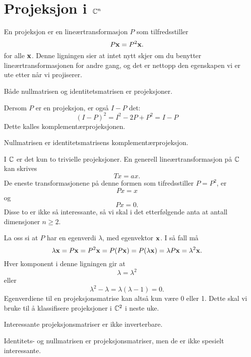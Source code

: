 



 \section*{Projeksjon i $\mathbb{C}^n$}
En projeksjon er en lineærtransformasjon $P$ som tilfredsstiller
\[
 P\mathbf{x}=P^2\mathbf{x}.
 \]
 for alle $\mathbf{x}$. Denne ligningen sier at intet nytt skjer om du benytter lineærtransformasjonen for andre gang, 
 og det er nettopp den egenskapen vi er ute etter når vi projiserer. 
 
 \begin{ex}
Både nullmatrisen og identitetsmatrisen er projeksjoner.
 \end{ex}
 
\noindent Dersom $P$ er en projeksjon, er også $I-P$ det:
\[
 (I-P)^2=I^2-2P+P^2=I-P
 \]
Dette kalles komplementærprojeksjonen.
 
\begin{ex}
Nullmatrisen er identitetsmatrisens  komplementærprojeksjon.
\end{ex}
 
 I $\mathbb{C}$ er det kun to trivielle projeksjoner. En generell lineærtransformasjon på $\mathbb{C}$ kan skrives 
 \[
 Tx=ax.
 \]
De eneste transformasjonene på denne formen som tifredsstiller $P=P^2$, er
 \[
 Px=x
\]
og 
 \[
 Px=0.
\]
Disse to er ikke så interessante, så vi skal i det etterfølgende anta at antall dimensjoner $n\geq 2$.

La oss si at $P$ har en egenverdi $\lambda$, med egenvektor $\mathbf{x}$. I så fall må
\[
\lambda \mathbf{x}=P\mathbf{x}=P^2\mathbf{x}=P(P\mathbf{x})=P(\lambda\mathbf{x})=\lambda P\mathbf{x}=\lambda^2 \mathbf{x}.
\]
Hver komponent i denne ligningen gir at
\[
\lambda=\lambda^2
\]
eller
\[
\lambda^2-\lambda=\lambda(\lambda-1)=0.
\]
Egenverdiene til en projeksjonsmatrise kan altså kun være  0 eller 1. Dette skal vi bruke til å klassifisere projeksjoner i $\mathbb{C}^2$ i neste uke.
 
\begin{fishythm}
Interessante projeksjonsmatriser er ikke inverterbare.
\end{fishythm}

\begin{merkx}
Identitets- og nullmatrisen er projeksjonsmatriser, men de er ikke spesielt interessante.
\end{merkx}

